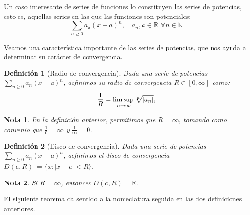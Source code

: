 \documentclass[11pt, a4paper]{article}
\theoremstyle{theorem-style}
\theoremstyle{definition-style}
\newtheorem{ndef}{Definición}[section]
\theoremstyle{remark-style}
\newtheorem*{nota}{Nota}
\theoremstyle{example-style}
\begin{document}
Un caso interesante de series de funciones lo constituyen las series de potencias, esto es, aquellas series en las que las funciones son potenciales: $$\sum_{n \ge 0} a_n(x-a)^n, \quad a_n, a \in \mathbb{R} \ \ \forall n \in \mathbb{N}$$

Veamos una característica importante de las series de potencias, que nos ayuda a determinar su carácter de convergencia.

\begin{ndef}[Radio de convergencia] Dada una serie de potencias $\sum_{n \ge 0} a_n(x-a)^n$, definimos su radio de convergencia $R \in [0, \infty]$ como: $$
  \frac{1}{R} =\underset{n\to\infty}{\mbox{lim\,sup\,}}  \sqrt[n]{|a_n|},$$
\end{ndef}

\begin{nota}
  En la definición anterior, permitimos que $R = \infty$, tomando como convenio que $\frac{1}{0} = \infty$ y $\frac{1}{\infty} = 0$.
\end{nota}

\begin{ndef}[Disco de convergencia] Dada una serie de potencias $\sum_{n \ge 0} a_n(x-a)^n$, definimos el disco de convergencia $D(a,R) := \{ x : |x-a| < R\}$. 
\end{ndef}

\begin{nota}
  Si $R = \infty$, entonces $D(a,R) = \mathbb{R}$.
\end{nota}

El siguiente teorema da sentido a la nomeclatura seguida en las dos definiciones anteriores.
\end{document}

